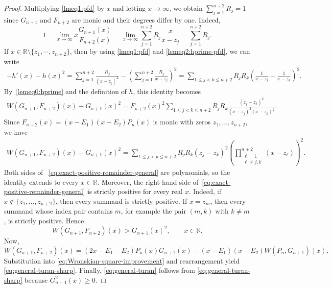 \documentclass[final,3p,times,12pt]{elsarticle}
\numberwithin{equation}{section}  %
\begin{document}
\begin{proof}
Multiplying \eqref{lmeq1:pfd} by $x$ and letting $x\rightarrow \infty$, we obtain $\sum_{j=1}^{n+2}R_j=1$ since $G_{n+1}$ and $F_{n+2}$ are monic and their degrees differ by one. Indeed, \[1=\lim_{x\to\infty}x\frac{G_{n+1}(x)}{F_{n+2}(x)}= \lim_{x\to \infty}\sum_{j=1}^{n+2}R_j\frac{x}{x-z_j}=\sum_{j=1}^{n+2}R_j.\] If $x\in\mathbb{R}\setminus\{z_1,\cdots,z_{n+2}\}$, then  by using \eqref{lmeq1:pfd} and \eqref{lemeq2:hprime-pfd},  we can write
	\begin{align*}
		-h'(x)-h(x)^2
		=
		\sum_{j=1}^{n+2}\frac{R_j}{(x-z_j)^2}
		-
		\left(
		\sum_{j=1}^{n+2}\frac{R_j}{x-z_j}
		\right)^2                                             
		=
		\sum_{1\leq j<k\leq n+2}
		R_jR_k
		\left(
		\frac{1}{x-z_j}-\frac{1}{x-z_k}
		\right)^2.
	\end{align*}
	By~\eqref{lemeq0:hprime} and the definition of $h$, this identity becomes
	\begin{align*}
		W(G_{n+1},F_{n+2})(x)	-
		G_{n+1}(x)^2                                    
		=
		F_{n+2}(x)^2
		\sum_{1\leq j<k\leq n+2}
		R_jR_k
		\frac{(z_j-z_k)^2}
		{(x-z_j)^2(x-z_k)^2}.
	\end{align*}
	Since $F_{n+2}(x)=(x-E_1)(x-E_2)P_n(x)$ is monic with zeros $z_1,\ldots,z_{n+2}$, we have
	\begin{equation}\label{eq:exact-positive-remainder-general}
		\begin{aligned}
			W(G_{n+1},F_{n+2})(x)	-G_{n+1}(x)^2                                    
			=
			\sum_{1\leq j<k\leq n+2}
			R_jR_k(z_j-z_k)^2
			\left(
			\prod_{\substack{\ell=1\\ \ell\neq j,k}}^{n+2}
			(x-z_{\ell})
			\right)^2.
		\end{aligned}
	\end{equation}
	Both sides of ~\eqref{eq:exact-positive-remainder-general} are polynomials, so the identity extends to every
\(x\in\mathbb{R}\). Moreover, the right-hand side of~\eqref{eq:exact-positive-remainder-general}
	is strictly positive for every real $x$. Indeed, if $x\notin\{z_1,\ldots,z_{n+2}\}$, then every summand is
strictly positive. If $x=z_m$, then every summand whose index pair contains $m$, for example the pair $(m,k)$ with
$k\neq m$, is strictly positive. Hence
	\begin{equation}\label{eq:Wronskian-square-improvement}
		W(G_{n+1},F_{n+2})(x)
		>
		G_{n+1}(x)^2,
		\qquad x\in\mathbb{R}.
	\end{equation} Now,
\[W(G_{n+1},F_{n+2})(x)=(2x-E_1-E_2)P_n(x)G_{n+1}(x) -(x-E_1)(x-E_2)W(P_n,G_{n+1})(x).\]
Substitution into \eqref{eq:Wronskian-square-improvement} and rearrangement yield \eqref{eq:general-turan-sharp}.
Finally, \eqref{eq:general-turan} follows from \eqref{eq:general-turan-sharp} because \(G_{n+1}^2(x)\ge0\). 
\end{proof}
 
\end{document}
